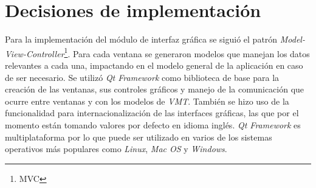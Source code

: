 \section{Decisiones de implementación}
Para la implementación del módulo de interfaz gráfica se siguió el patrón \emph{Model-View-Controller}\footnote{MVC}. Para cada ventana se generaron modelos que manejan los datos relevantes a cada una, impactando en el modelo general de la aplicación en caso de ser necesario.
Se utilizó \emph{Qt Framework}\cite{Qt-framework} como biblioteca de base para la creación de las ventanas, sus controles gráficos y manejo de la comunicación que ocurre entre ventanas y con los modelos de \emph{VMT}. También se hizo uso de la funcionalidad para internacionalización de las interfaces gráficas, las que por el momento están tomando valores por defecto en idioma inglés. \emph{Qt Framework} es multiplataforma por lo que puede ser utilizado en varios de los sistemas operativos más populares como \emph{Linux}, \emph{Mac OS} y \emph{Windows}.